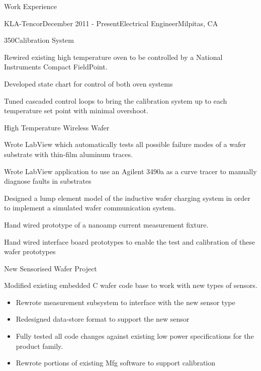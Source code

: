 \documentclass{resume} %
\begin{document}

\begin{rSection}{Work Experience}

\begin{rSubsection}{KLA-Tencor}{December 2011 - Present}{Electrical Engineer}{Milpitas, CA}

\begin{rWorkProject}{350\celsius \space Calibration System}
\item Rewired existing high temperature oven to be controlled by a National Instruments Compact FieldPoint.
\item Developed state chart for control of both oven systems
\item Tuned cascaded control loops to bring the calibration system up to each temperature set point with minimal overshoot.
\end{rWorkProject}

\begin{rWorkProject}{High Temperature Wireless Wafer}
\item Wrote LabView which automatically tests all possible failure modes of a wafer substrate with thin-film aluminum traces.
\item Wrote LabView application to use an Agilent 3490a as a curve tracer to manually diagnose faults in substrates
\item Designed a lump element model of the inductive wafer charging system in order to implement a simulated wafer communication system.
\item Hand wired prototype of a nanoamp current measurement fixture.
\item Hand wired interface board prototypes to enable the test and calibration of these wafer prototypes
\end{rWorkProject}

\begin{rWorkProject}{New Sensorised Wafer Project}
\item Modified existing embedded C wafer code base to work with new types of sensors.
\begin{itemize}
\itemsep -0.5em \vspace{-0.5em}
\renewcommand{\labelitemi}{-}
\item Rewrote measurement subsystem to interface with the new sensor type
\item Redesigned data-store format to support the new sensor
\item Fully tested all code changes against existing low power specifications for the product family.
\item Rewrote portions of existing Mfg software to support calibration
\end{itemize}


\end{rWorkProject}
\end{rSubsection}
\end{rSection}
\end{document}
